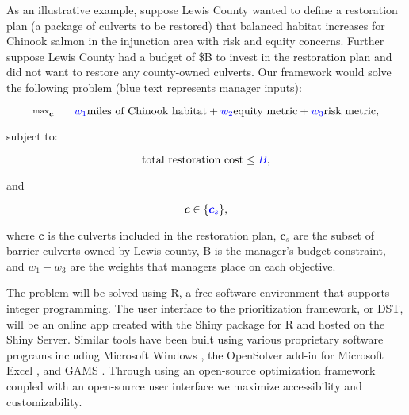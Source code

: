 \documentclass[12pt]{elsarticle}
\begin{document}

As an illustrative example, suppose Lewis County wanted to define a restoration plan (a package of culverts to be restored) that balanced habitat increases for Chinook salmon in the injunction area with risk and equity concerns. Further suppose Lewis County had a budget of \$B to invest in the restoration plan and did not want to restore any county-owned culverts. Our framework would solve the following problem (blue text represents manager inputs):

\begin{equation*}
\substack{\text{max}}_{\boldsymbol{c}}\hspace{0.25in} \textcolor{blue}{w_1} \text{miles of Chinook habitat} + \textcolor{blue}{w_2} \text{equity metric} + \textcolor{blue}{w_3} \text{risk metric},
\end{equation*}

\noindent subject to:

\begin{equation*}
\text{total restoration cost} \le \textcolor{blue}{B},
\end{equation*}

\noindent and

\begin{equation*}
\boldsymbol{c} \in \{\textcolor{blue}{\boldsymbol{c}_s}  \},
\end{equation*}

where $\boldsymbol{c}$ is the culverts included in the restoration plan, $\boldsymbol{c}_s$ are the subset of barrier culverts owned by Lewis county, B is the manager's budget constraint, and $w_1-w_3$ are the weights that managers place on each objective. 

The problem will be solved using R, a free software environment that supports integer programming. The user interface to the prioritization framework, or DST, will be an online app created with the Shiny package for R and hosted on the Shiny Server. Similar tools have been built using various proprietary software programs including Microsoft Windows \citep{optipass2015migratory}, the OpenSolver add-in for Microsoft Excel \citep{mcmanamay2019commonalities}, and GAMS \citep{moody2017pet}. Through using an open-source optimization framework coupled with an open-source user interface we maximize accessibility and customizability.  
\end{document}
